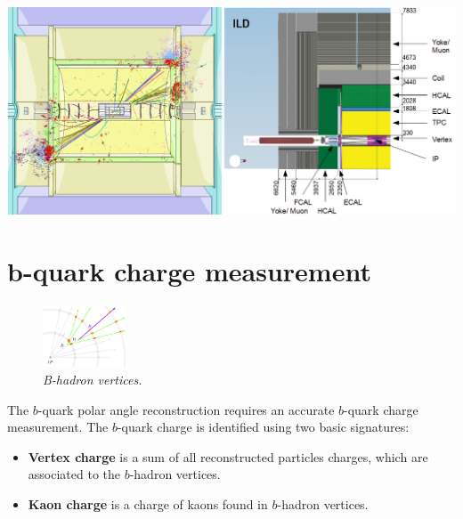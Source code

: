 \begin{center}\vspace{1.8cm}
	\centering
	
	\includegraphics[width=0.9\linewidth]{figures/ild3.png}
	\label{fig:ILDScheme}
\end{center}\vspace{1cm}

\color{DarkSlateGray} %

\section*{$\pmb{b}$-quark charge measurement}
\setlength{\columnsep}{20pt}%
\begin{figure}
	
	\includegraphics[width=0.22\textwidth]{figures/vtx.pdf}
	\caption{\sl B-hadron vertices.}
	\label{fig:vtx}

\end{figure}

\color{Blue}
The $b$-quark polar angle reconstruction requires an accurate $b$-quark charge measurement. 
The $b$-quark charge is identified using two basic signatures:
\begin{itemize}
	\item \textbf{Vertex charge} is a sum of all reconstructed particles charges, which are associated to the $b$-hadron vertices. 
	\item \textbf{Kaon charge} is a charge of kaons found in $b$-hadron vertices. 
\end{itemize}


